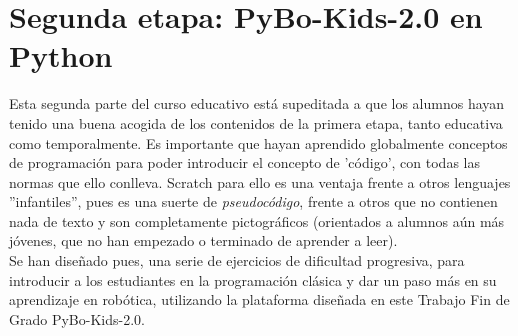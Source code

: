 \section{Segunda etapa: PyBo-Kids-2.0 en Python}\label{sec:Python}
Esta segunda parte del curso educativo está supeditada a que los alumnos hayan tenido una buena acogida de los contenidos de la primera etapa, tanto educativa como temporalmente. Es importante que hayan aprendido globalmente conceptos de programación para poder introducir el concepto de 'código', con todas las normas que ello conlleva. Scratch para ello es una ventaja frente a otros lenguajes ''infantiles'', pues es una suerte de \textit{pseudocódigo}, frente a otros que no contienen nada de texto y son completamente pictográficos (orientados a alumnos aún más jóvenes, que no han empezado o terminado de aprender a leer). \\
Se han diseñado pues, una serie de ejercicios de dificultad progresiva, para introducir a los estudiantes en la programación clásica y dar un paso más en su aprendizaje en robótica, utilizando la plataforma diseñada en este Trabajo Fin de Grado PyBo-Kids-2.0.
